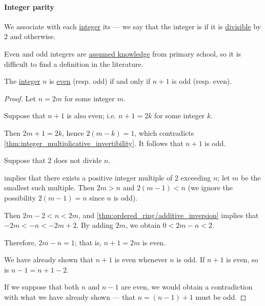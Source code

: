 \paragraph{Integer parity}

\begin{definition}\label{def:integer_parity}\mimprovised
  We associate with each \hyperref[def:integers]{integer} its  --- we say that the integer is  if it is \hyperref[def:semiring_divisibility]{divisible} by \( 2 \) and  otherwise.
\end{definition}
\begin{comments}
  \item Even and odd integers are \hyperref[con:assumed_knowledge]{assumed knowledge} from primary school, so it is difficult to find a definition in the literature.
\end{comments}

\begin{lemma}\label{thm:integer_successor_parity}
  The \hyperref[def:integers]{integer} \( n \) is \hyperref[def:integer_parity]{even} (resp. odd) if and only if \( n + 1 \) is odd (resp. even).
\end{lemma}
\begin{proof}
  \SufficiencySubProof
   Let \( n = 2m \) for some integer \( m \).

  Suppose that \( n + 1 \) is also even; i.e. \( n + 1 = 2k \) for some integer \( k \).

  Then \( 2m + 1 = 2k \), hence \( 2(m - k) = 1 \), which contradicts \cref{thm:integer_multiplicative_invertibility}. It follows that \( n + 1 \) is odd.

   Suppose that \( 2 \) does not divide \( n \).

   implies that there exists a positive integer multiple of \( 2 \) exceeding \( n \); let \( m \) be the smallest such multiple. Then \( 2m > n \) and \( 2(m - 1) < n \) (we ignore the possibility \( 2(m - 1) = n \) since \( n \) is odd).

  Then \( 2m - 2 < n < 2m \), and \cref{thm:ordered_ring/additive_inversion} implies that \( -2m < -n < -2m + 2 \). By adding \( 2m \), we obtain \( 0 < 2m - n < 2 \).

  Therefore, \( 2m - n = 1 \); that is, \( n + 1 = 2m \) is even.

  \NecessitySubProof
   We have already shown that \( n + 1 \) is even whenever \( n \) is odd. If \( n + 1 \) is even, so is \( n - 1 = n + 1 - 2 \).

   If we suppose that both \( n \) and \( n - 1 \) are even, we would obtain a contradiction with what we have already shown --- that \( n = (n - 1) + 1 \) must be odd.
\end{proof}


